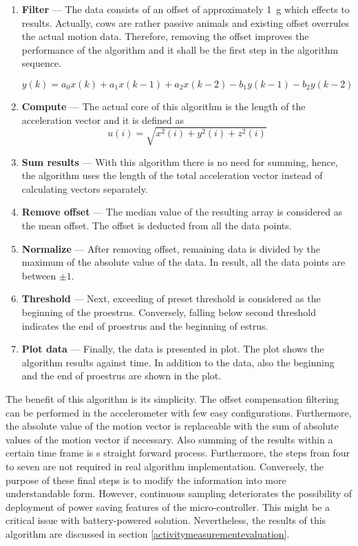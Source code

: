 \documentclass[english,12pt,a4paper,pdftex,elec,utf8]{aaltothesis}
\begin{document}
\begin{enumerate}
\item \textbf{Filter} --- The data consists of an offset of approximately \SI{1}{\gram} which effects to results. Actually, cows are rather passive animals and existing offset overrules the actual motion data. Therefore, removing the offset improves the performance of the algorithm and it shall be the first step in the algorithm sequence.

\begin{equation}
y(k) = a_0 x(k) + a_1 x(k-1) + a_2 x(k-2) - b_1 y(k-1) - b_2 y(k-2)
\end{equation}

\item \textbf{Compute} --- The actual core of this algorithm is the length of the acceleration vector and it is defined as \begin{equation}
u(i) = \sqrt{x^2(i) + y^2(i) + z^2(i)} 
\end{equation}

\item \textbf{Sum results} --- With this algorithm there is no need for summing, hence, the algorithm uses the length of the total acceleration vector instead of calculating vectors separately.

\item \textbf{Remove offset} --- The median value of the resulting array is considered as the mean offset. The offset is deducted from all the data points.

\item \textbf{Normalize} --- After removing offset, remaining data is divided by the maximum of the absolute value of the data. In result, all the data points are between $\pm 1$.

\item \textbf{Threshold} --- Next, exceeding of preset threshold is considered as the beginning of the proestrus. Conversely, falling below second threshold indicates the end of proestrus and the beginning of estrus.

\item \textbf{Plot data} --- Finally, the data is presented in plot. The plot shows the algorithm results against time. In addition to the data, also the beginning and the end of proestrus are shown in the plot.

\end{enumerate}
The benefit of this algorithm is its simplicity. The offset compensation filtering can be performed in the accelerometer with few easy configurations. Furthermore, the absolute value of the motion vector is replaceable with the sum of absolute values of the motion vector if necessary. Also summing of the results within a certain time frame is s straight forward process. Furthermore, the steps from four to seven are not required in real algorithm implementation. Conversely, the purpose of these final steps is to modify the information into more understandable form. However, continuous sampling deteriorates the possibility of deployment of power saving  features of the micro-controller. This might be a critical issue with battery-powered solution. Nevertheless, the results of this algorithm are discussed in section \ref{activitymeasurementevaluation}. 
\end{document}
